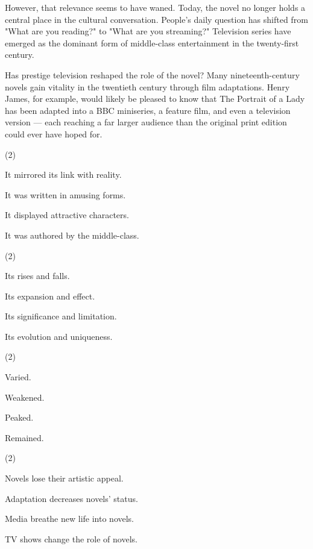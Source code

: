\documentclass{英语试卷}
\begin{document}
\par However, that relevance seems to have waned. Today, the novel no longer holds a central place in the cultural conversation. People's daily question has shifted from "What are you reading?" to "What are you streaming?" Television series have emerged as the dominant form of middle-class entertainment in the twenty-first century.\par
\par Has prestige television reshaped the role of the novel? Many nineteenth-century novels gain vitality in the twentieth century through film adaptations. Henry James, for example, would likely be pleased to know that The Portrait of a Lady has been adapted into a BBC miniseries, a feature film, and even a television version — each reaching a far larger audience than the original print edition could ever have hoped for.\par
{}
\begin{choices}(2)
  \item It mirrored its link with reality.
  \item It was written in amusing forms.
  \item It displayed attractive characters.
  \item It was authored by the middle-class.
\end{choices}
\begin{choices}(2)
  \item Its rises and falls.
  \item Its expansion and effect.
  \item Its significance and limitation.
  \item Its evolution and uniqueness.
\end{choices}
\begin{choices}(2)
  \item Varied.
  \item Weakened.
  \item Peaked.
  \item Remained.
\end{choices}
\begin{choices}(2)
  \item Novels lose their artistic appeal.
  \item Adaptation decreases novels' status.
  \item Media breathe new life into novels.
  \item TV shows change the role of novels.
\end{choices}
\end{document}
